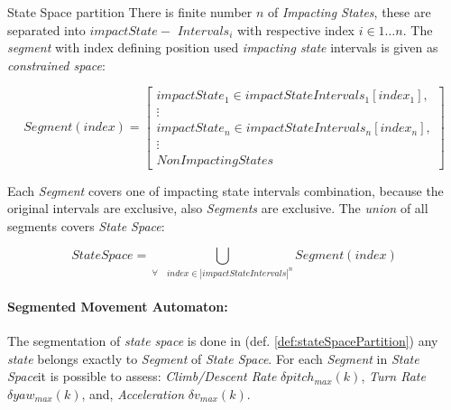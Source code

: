 \begin{definition}{State Space partition}
    There is finite number $n$ of \emph{Impacting States}, these are separated into $impactState-$ $Intervals_i$ with respective index $i \in 1\dots n$. The \emph{segment} with index defining position used \emph{impacting state} intervals is given as \emph{constrained space}:
    
    \begin{equation}
        Segment(index) = \left[
            \begin{gathered}
                impactState_1 \in impactStateIntervals_1[index_1],\\
                \vdots\\
                impactState_n \in impactStateIntervals_n[index_n],\\
                \vdots\\
                NonImpactingStates    
                \end{gathered}\right]
    \end{equation}
    
    Each \emph{Segment} covers one of impacting state intervals combination, because the original intervals are exclusive, also \emph{Segments} are exclusive. The \emph{union} of all segments covers \emph{State Space}:
    
    \begin{equation}\label{eq:segmentedStateSpace}
        StateSpace = \bigcup_{\forall\quad index \in |impactStateIntervals|^n} Segment(index)
    \end{equation}
\end{definition}

\paragraph{Segmented Movement Automaton:} The segmentation of \emph{state space} is done  in (def. \ref{def:stateSpacePartition}) any \emph{state} belongs exactly to \emph{Segment} of \emph{State Space}. For each \emph{Segment} in \emph{State Space}it is possible to assess: \emph{Climb/Descent Rate} $\delta pitch_{max}(k)$, \emph{Turn Rate} $\delta yaw_{max}(k)$, and, \emph{Acceleration} $\delta v_{max}(k)$.


